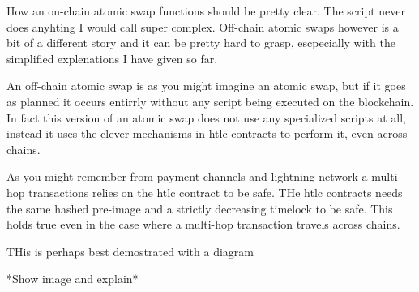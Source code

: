 How an on-chain atomic swap functions should be pretty clear. The script never does
anyhting I would call super complex. Off-chain atomic swaps however is a bit of
a different story and it can be pretty hard to grasp, escpecially with the
simplified explenations I have given so far. 

An off-chain atomic swap is as you might imagine an atomic swap, but if
it goes as planned it occurs entirrly without any script being executed
on the blockchain. In fact this version of an atomic swap does not use any
specialized scripts at all, instead it uses the clever mechanisms in htlc
contracts to perform it, even across chains. 

As you might remember from payment channels and lightning network 
a multi-hop transactions relies on the htlc contract to be safe. 
THe htlc contracts needs the same hashed pre-image and a strictly
decreasing timelock to be safe. This holds true even in the 
case where a multi-hop transaction travels across chains. 

THis is perhaps best demostrated with a diagram

*Show image and explain*




